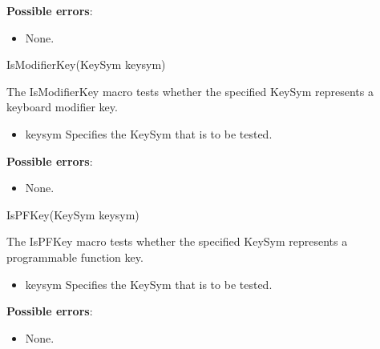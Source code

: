 \documentclass{report}
\begin{document}
\begin{itemize}
        \textbf{Possible errors}:
        \begin{itemize}
            \item None.
        \end{itemize}

        \begin{cppcode}
        IsModifierKey(KeySym keysym)
        \end{cppcode}
        \bigbreak \noindent
        The IsModifierKey macro tests whether the specified KeySym represents a keyboard modifier key.
        \begin{itemize}
            \item keysym Specifies the KeySym that is to be tested.
        \end{itemize}

        \textbf{Possible errors}:
        \begin{itemize}
            \item None.
        \end{itemize}

        \begin{cppcode}
        IsPFKey(KeySym keysym)
        \end{cppcode}
        \bigbreak \noindent
        The IsPFKey macro tests whether the specified KeySym represents a programmable function key.
        \begin{itemize}
            \item keysym Specifies the KeySym that is to be tested.
        \end{itemize}

        \textbf{Possible errors}:
        \begin{itemize}
            \item None.
        \end{itemize}

    \end{itemize}
\end{document}
